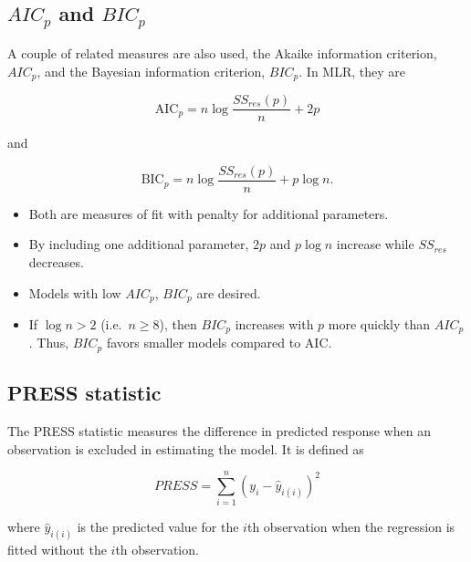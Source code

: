 \documentclass[
]{book}
\providecommand{\tightlist}{%
  \setlength{\itemsep}{0pt}\setlength{\parskip}{0pt}}
\begin{document}
\hypertarget{aic_p-and-bic_p}{%
\subsection{\texorpdfstring{\(AIC_p\) and \(BIC_p\)}{AIC\_p and BIC\_p}}\label{aic_p-and-bic_p}}

A couple of related measures are also used, the Akaike information criterion, \(AIC_p\), and the Bayesian information criterion, \(BIC_p\). In MLR, they are

\begin{equation} 
\mbox{AIC}_p = n\log \frac{SS_{res}(p)}{n} + 2p
\label{eq:9aic}
\end{equation}

and

\begin{equation}
\mbox{BIC}_p = n\log \frac{SS_{res}(p)}{n} +p\log n.
\label{eq:9bic}
\end{equation}

\begin{itemize}
\tightlist
\item
  Both are measures of fit with penalty for additional parameters.
\item
  By including one additional parameter, \(2p\) and \(p\log n\) increase while \(SS_{res}\) decreases.
\item
  Models with low \(AIC_p\), \(BIC_p\) are desired.
\item
  If \(\log n > 2\) (i.e.~\(n \geq 8\)), then \(BIC_p\) increases with \(p\) more quickly than \(AIC_p\). Thus, \(BIC_p\) favors smaller models compared to AIC.
\end{itemize}

\hypertarget{press-statistic}{%
\subsection{PRESS statistic}\label{press-statistic}}

The PRESS statistic measures the difference in predicted response when an observation is excluded in estimating the model. It is defined as

\begin{equation} 
PRESS = \sum_{i=1}^n\left(y_i-\hat{y}_{i(i)}\right)^2
\label{eq:9PRESS}
\end{equation}

where \(\hat{y}_{i(i)}\) is the predicted value for the \(i\)th observation
when the regression is fitted without the \(i\)th observation.
\end{document}
